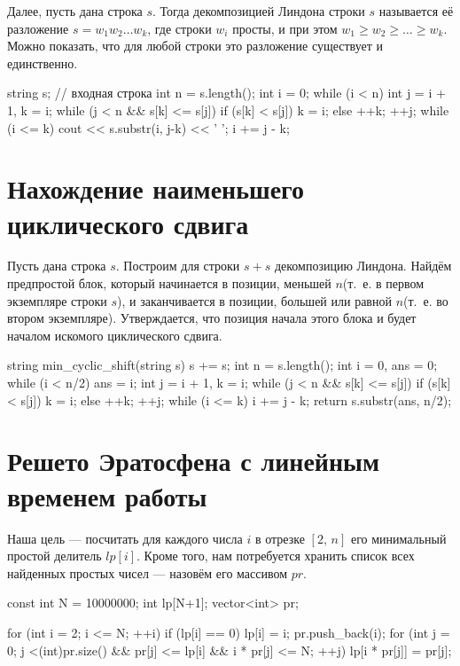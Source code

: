 \documentclass[12pt, titlepage]{article}
\begin{document}
Далее, пусть дана строка $s$. Тогда декомпозицией Линдона строки $s$ называется её разложение $s=w_1w_2\ldots w_k$, где строки $w_i$ просты, и при этом $w_1 \ge w_2 \ge \ldots \ge w_k$. Можно показать, что для любой строки  это разложение существует и единственно.

\begin{cppcode}
string s; // входная строка
int n = s.length();
int i = 0;
while (i < n) {
    int j = i + 1, k = i;
    while (j < n && s[k] <= s[j]) {
        if (s[k] < s[j])
            k = i;
        else
            ++k;
        ++j;
    }
    while (i <= k) {
        cout << s.substr(i, j-k) << ' ';
        i += j - k;
    }
}
\end{cppcode}


\section{Нахождение наименьшего циклического сдвига}

Пусть дана строка $s$. Построим для строки $s+s$ декомпозицию Линдона. Найдём предпростой блок, который начинается в позиции, меньшей $n$(т.~е. в первом экземпляре строки $s$), и заканчивается в позиции, большей или равной $n$(т.~е. во втором экземпляре). Утверждается, что позиция начала этого блока и будет началом искомого циклического сдвига.

\begin{cppcode}
string min_cyclic_shift(string s) {
    s += s;
    int n = s.length();
    int i = 0, ans = 0;
    while (i < n/2) {
        ans = i;
        int j = i + 1, k = i;
        while (j < n && s[k] <= s[j]) {
            if (s[k] < s[j])
                k = i;
            else
                ++k;
            ++j;
        }
        while (i <= k) i += j - k;
    }
    return s.substr(ans, n/2);
}
\end{cppcode}


\section{Решето Эратосфена с линейным временем работы}

Наша цель — посчитать для каждого числа $i$ в отрезке $[2,\,n]$ его минимальный простой делитель $lp[i]$. Кроме того, нам потребуется хранить список всех найденных простых чисел — назовём его массивом $pr$.

\begin{cppcode}
const int N = 10000000;
int lp[N+1];
vector<int> pr;
 
for (int i = 2; i <= N; ++i) {
    if (lp[i] == 0) {
        lp[i] = i;
        pr.push_back(i);
    }
    for (int j = 0; j <(int)pr.size() && pr[j] <= lp[i] && i * pr[j] <= N; ++j)
        lp[i * pr[j]] = pr[j];
}
\end{cppcode}
\end{document}
